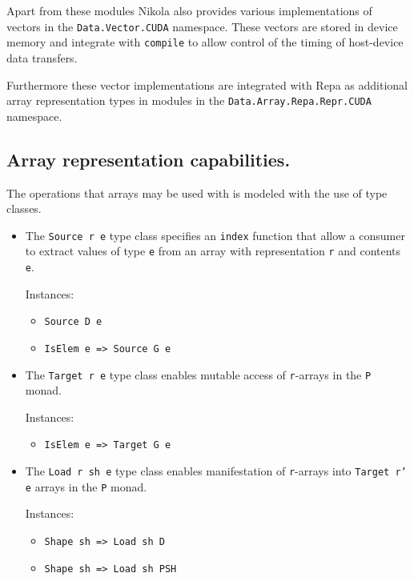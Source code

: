 Apart from these modules Nikola also provides various implementations of
vectors in the \texttt{Data.Vector.CUDA} namespace. These vectors are
stored in device memory and integrate with \texttt{compile} to allow
control of the timing of host-device data transfers.

Furthermore these vector implementations are integrated with Repa as additional
array representation types in modules in the \texttt{Data.Array.Repa.Repr.CUDA}
namespace.

\subsection{Array representation capabilities.}

The operations that arrays may be used with is modeled with the use of type
classes.

\begin{itemize}

  \item The \texttt{Source r e} type class specifies an \texttt{index}
    function that allow a consumer to extract values of type \texttt{e} from an
    array with representation \texttt{r} and contents \texttt{e}.

    Instances:
    \begin{itemize}
      \item \texttt{Source D e}
      \item \texttt{IsElem e => Source G e}
    \end{itemize}

  \item The \texttt{Target r e} type class enables mutable access of
    \texttt{r}-arrays in the \texttt{P} monad.

    Instances:
    \begin{itemize}
      \item \texttt{IsElem e => Target G e}
    \end{itemize}

  \item The \texttt{Load r sh e} type class enables manifestation of
    \texttt{r}-arrays into \texttt{Target r' e} arrays in the \texttt{P} monad.

    Instances:
    \begin{itemize}
      \item \texttt{Shape sh => Load sh D}
      \item \texttt{Shape sh => Load sh PSH}
    \end{itemize}
\end{itemize}
